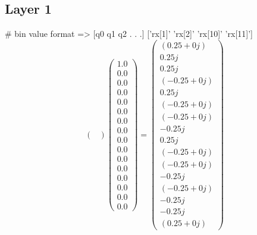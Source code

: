 \documentclass{article}%
\begin{document}
\subsection{Layer 1}%
\label{subsec:Layer1}%
\#  bin value format       => {[}q0 q1 q2 . . .{]}\newline%
%
{[}'rx{[}1{]}' 'rx{[}2{]}' 'rx{[}10{]}' 'rx{[}11{]}'{]}%
\[%
\begin{pmatrix}%
%
\end{pmatrix} \begin{pmatrix}%
1.0\\%
0.0\\%
0.0\\%
0.0\\%
0.0\\%
0.0\\%
0.0\\%
0.0\\%
0.0\\%
0.0\\%
0.0\\%
0.0\\%
0.0\\%
0.0\\%
0.0\\%
0.0%
\end{pmatrix} = \begin{pmatrix}%
(0.25+0j)\\%
0.25j\\%
0.25j\\%
(-0.25+0j)\\%
0.25j\\%
(-0.25+0j)\\%
(-0.25+0j)\\%
-0.25j\\%
0.25j\\%
(-0.25+0j)\\%
(-0.25+0j)\\%
-0.25j\\%
(-0.25+0j)\\%
-0.25j\\%
-0.25j\\%
(0.25+0j)%
\end{pmatrix}%
\]

%
\end{document}

